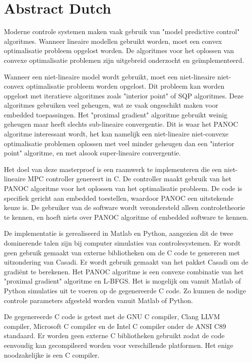 \chapter{Abstract Dutch}
Moderne controle systemen maken vaak gebruik van "model predictive control" algoritmes. Wanneer lineaire modellen gebruikt worden, moet een convex optimalisatie probleem opgelost worden. De algoritmes voor het oplossen van convexe optimalisatie problemen zijn uitgebreid onderzocht en ge\"{i}mplementeerd. 

Wanneer een niet-lineaire model wordt gebruikt, moet een niet-lineaire niet-convex optimalisatie probleem worden opgelost. Dit probleem kan worden opgelost met iteratieve algoritmes zoals "interior point" of SQP algoritmes. Deze algoritmes gebruiken veel geheugen, wat ze vaak ongeschikt maken voor embedded toepassingen. Het "proximal gradient" algoritme gebruikt weinig geheugen maar heeft slechts sub-lineaire convergentie. Dit is waar het PANOC algoritme interessant wordt, het kan namelijk een niet-lineaire niet-convexe optimalisatie problemen oplossen met veel minder geheugen dan een "interior point" algoritme, en met alsook super-lineaire convergentie. 

Het doel van deze masterproef is een raamwerk te implementeren die een niet-lineaire MPC controller genereert in C. De controller maakt gebruik van het PANOC algoritme voor het oplossen van het optimalisatie probleem. De code is specifiek gericht aan embedded toestellen, waardoor PANOC een uitstekende keuze is. De gebruiker van de software wordt verondersteld alleen controletheorie te kennen, en hoeft niets over PANOC algoritme of embedded software te kennen.

De implementatie is gerealiseerd in Matlab en Python, aangezien dit de twee dominerende talen zijn bij computer simulaties van controlesystemen. Er wordt geen gebruik gemaakt van externe bibliotheken om de C code te genereren met uitzondering van Casadi. Er wordt gebruik gemaakt van het pakket Casadi om de gradi\"{e}nt te berekenen. Het PANOC algoritme is een convexe combinatie van het "proximal gradient" algoritme en L-BFGS.  Het is mogelijk om vanuit Matlab of Python simulaties uit te voeren op de gegenereerde C code. Zo kunnen de nodige controle parameters afgesteld worden vanuit Matlab of Python.

De gegenereerde C code is getest met de GNU C compiler, Clang LLVM compiler, Microsoft C compiler en de Intel C compiler onder de ANSI C89 standaard. Er worden geen externe C bibliotheken gebruikt zodat de code eenvoudig kan gecompileerd worden voor verschillende platformen. Het enige noodzakelijke is een C compiler.

